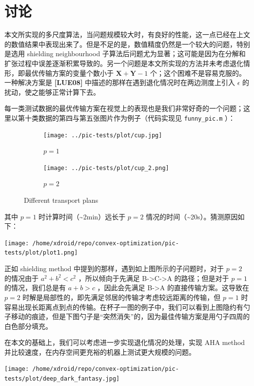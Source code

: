 \documentclass[]{article}
\begin{document}
\section{讨论}

本文所实现的多尺度算法，当问题规模较大时，有良好的性能，这一点已经在上文的数值结果中表现出来了。但是不足的是，数值精度仍然是一个较大的问题，特别是选用
shielding neighbourhood
子算法后问题尤为显著；这可能是因为在分解和扩张过程中误差逐渐积累导致的。另一个问题是本文所实现的方法并未考虑退化情形，即最优传输方案的变量个数小于
\(\mathbf{X} + \mathbf{Y} -1\)
个；这个困难不是容易克服的。一种解决方案是 \textbf{{[}LUE08{]}}
中描述的那样在遇到退化情况时在两边测度上引入 \(\epsilon\)
的扰动，使之能够正常计算下去。

每一类测试数据的最优传输方案在视觉上的表现也是我们非常好奇的一个问题；这里以第十类数据的第四与第五张图片作为例子（代码实现见
\texttt{funny\_pic.m} ）：

\begin{figure}[htpb]
	\centering
	\begin{subfigure}{\textwidth}
		\centering
		\texttt{[image: ../pic-tests/plot/cup.jpg]}
		\caption{$p=1$}
	\end{subfigure}
	\begin{subfigure}{\textwidth}
		\centering
		\texttt{[image: ../pic-tests/plot/cup\_2.png]}
		\caption{$p=2$}
	\end{subfigure}
	\caption{Different transport plans}
\end{figure}


其中 \(p=1\) 时计算时间（\textasciitilde{}2min）远长于 \(p=2\)
情况的时间（\textasciitilde{}20s）。猜测原因如下：

\texttt{[image: /home/xdroid/repo/convex-optimization/pic-tests/plot/plot1.png]}

正如 shielding method 中提到的那样，遇到如上图所示的子问题时，对于
\(p=2\) 的情况由于 \(a^2+b^2 < c^2\) ，所以倾向于先满足
B-\textgreater{}C-\textgreater{}A 的路径；但是对于 \(p=1\)
的情况，我们总是有 \(a+b>c\) ，因此会先满足 B-\textgreater{}A
的直接传输方案。这导致在 \(p=2\)
时解是局部性的，即先满足邻居的传输才考虑较远距离的传输，但 \(p=1\)
时容易出现长距离点到点的传输。在杯子一图的例子中，我们可以看到上图隐约有勺子移动的痕迹，但是下图勺子是``突然消失''的，因为最佳传输方案是用勺子四周的白色部分填充。

在本文的基础上，我们可以考虑进一步实现退化情况的处理，实现 AHA method
并比较速度，在内存空间更充裕的机器上测试更大规模的问题。

\texttt{[image: /home/xdroid/repo/convex-optimization/pic-tests/plot/deep\_dark\_fantasy.jpg]}
\end{document}
